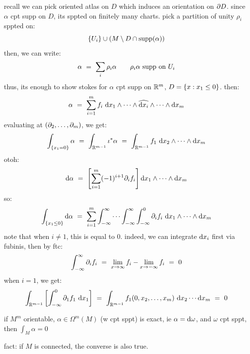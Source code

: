 recall we can pick oriented atlas on $D$ which induces an orientation on $\partial D$.
since $\alpha$ cpt supp on $D$, its sppted on finitely many charts.
pick a partition of unity $\rho_{i}$ sppted on:
\begin{equation*}
	\left\{{U_{i}}\right\} \cup (M\setminus D\cap\operatorname{supp}(\alpha))
\end{equation*}
then, we can write:
\begin{equation*}
	\alpha \ = \ \sum_{i}\rho_{i}\alpha \qquad
	\rho_{i}\alpha \textrm{ supp on } U_{i}
\end{equation*}
thus, its enough to show stokes for $\alpha$ cpt supp on $\mathbb{R}^{m}$, $D=\left\{{x:x_{1}\leq0}\right\}$.
then:
\begin{equation*}
	\alpha \ = \ \sum_{i=1}^{m}f_{i}\textrm{ d} x_{1}\wedge\cdots\wedge\widehat{\textrm{d} x_{i}}\wedge\cdots\wedge\textrm{d} x_{m}
\end{equation*}
evaluating at $(\partial_{2},\dots,\partial_{m})$, we get:
\begin{equation*}
	\int_{\set{x_{1}=0}}\alpha \ = \ \int_{\bR^{m-1}}\iota^{*}\alpha
	\ = \ \int_{\bR^{m-1}}f_{1}\di x_{2}\wedge\cdots\wedge\d x_{m}
\end{equation*}
otoh:
\begin{equation*}
	\d\alpha \ = \ \left[\sum_{i=1}^{m}(-1)^{i+1}\p_{i}f_{i}\right]
	\d x_{1}\wedge\cdots\wedge\d x_{m}
\end{equation*}
so:
\begin{equation*}
	\int_{\left\{{x_{1}\leq0}\right\}}\textrm{d}\alpha
	\ = \ \sum_{i=1}^{m}\int_{-\infty}^{\infty}\cdots \int_{-\infty}^{\infty}\int_{-\infty}^{0}
	\partial_{i}f_{i}\textrm{ d} x_{1}\wedge\cdots\wedge\textrm{d} x_{m}
\end{equation*}
note that when $i\neq1$, this is equal to 0.
indeed, we can integrate $\textrm{d} x_{i}$ first via fubinis, then by ftc:
\begin{equation*}
	\int_{-\infty}^{\infty}\partial_{i}f_{i} \ = \
	\lim_{x\rightarrow\infty}f_{i}-\lim_{x\rightarrow-\infty}f_{i} \ = \ 0
\end{equation*}
when $i=1$, we get:
\begin{equation*}
	\int_{\mathbb{R}^{m-1}}\left[\int_{-\infty}^{0}\partial_{1}f_{1}\textrm{ d} x_{1}\right]
	\ = \ \int_{\mathbb{R}^{m-1}}f_{1}(0,x_{2},\dots,x_{m})\textrm{ d} x_{2}\cdots\textrm{d} x_{m} \ = \ 0
\end{equation*}

\begin{crll}
	if $M^{m}$ orientable, $\alpha\in\Omega^{m}(M)$ (w cpt sppt) is exact, ie $\alpha=\textrm{d}\omega$,
	and $\omega$ cpt sppt, then $\int_{M}\alpha=0$
\end{crll}
fact: if $M$ is connected, the converse is also true. 

